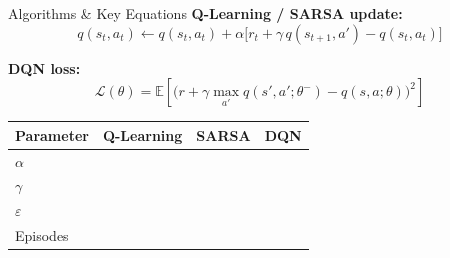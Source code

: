 \documentclass[aspectratio=169]{beamer}
\newcommand{\actionval}{\ensuremath{q}}
\newcommand{\discount}{\ensuremath{\gamma}}
\begin{document}
\begin{frame}{Algorithms \& Key Equations}
  \textbf{Q-Learning / SARSA update:}
  \[
    \actionval(s_t,a_t) \leftarrow \actionval(s_t,a_t)
    + \alpha\bigl[r_t + \discount\, \actionval(s_{t+1},a') - \actionval(s_t,a_t)\bigr]
  \]

  \textbf{DQN loss:}
  \[
    \mathcal{L}(\theta) = \mathbb{E}\!\left[
      \bigl(r + \discount\max_{a'}\actionval(s',a';\theta^{-})
      - \actionval(s,a;\theta)\bigr)^2\right]
  \]

  \begin{table}
    \centering
    \small
    \begin{tabular}{lccc}
      \toprule
      Parameter & Q-Learning & SARSA & DQN \\
      \midrule
      $\alpha$          & & & \\
      $\discount$       & & & \\
      $\varepsilon$     & & & \\
      Episodes          & & & \\
      \bottomrule
    \end{tabular}
  \end{table}
\end{frame}
\end{document}
